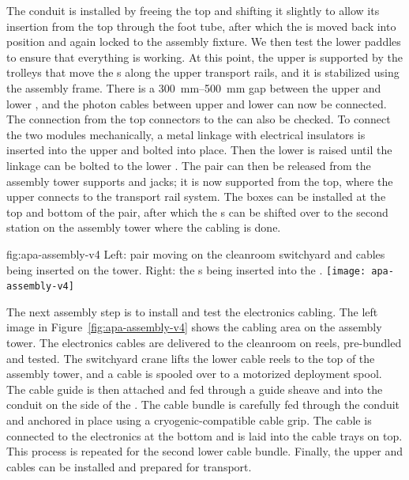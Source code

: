 The conduit is installed by freeing the top  and shifting it slightly to allow its insertion from the top through the foot tube, after which  
the  is moved back into position and again locked to the  assembly fixture.
We then test the lower   paddles %
to ensure that everything is working. 
At this point, the upper  is supported by the trolleys  that move the s along the upper transport rails, and it is stabilized using the  assembly frame. There is a \SIrange{300}{500}{mm} gap between the upper and lower , and the photon cables between upper and lower  can now be connected. The connection from the top connectors to the  can also be checked. 
To connect the two  modules mechanically, a metal linkage with electrical insulators is inserted into the upper  and bolted into place. Then the lower  is raised until the linkage can be bolted to the lower .  
The  pair can then be released from the assembly tower supports and jacks; it is now supported from the top, where the upper  connects to the transport rail system. The  boxes can be installed at the top and bottom of the  pair, after which %
the s can %
be shifted over to the second station on the assembly tower where the cabling is done.

\begin{dunefigure}{fig:apa-assembly-v4}
  { Left:  pair %
  moving on the cleanroom switchyard and cables being inserted on the tower. Right: the s being inserted into the \coldbox.}
\texttt{[image: apa-assembly-v4]}

\end{dunefigure}

The next assembly step is to install and test the electronics cabling.  The left image in Figure~\ref{fig:apa-assembly-v4} shows the  cabling area on the  assembly tower. 
The electronics cables are delivered to the cleanroom on reels,  pre-bundled and tested. 
The switchyard crane lifts the lower  cable reels to the top of the assembly tower, and a cable is %
spooled over to a motorized deployment spool. 
The cable guide is then attached and fed through a guide sheave and into the conduit on the side of the . The cable bundle is carefully fed through the conduit and anchored in place using a cryogenic-compatible cable grip. The cable is connected to the electronics at the bottom and is laid into the cable trays on top. This process is repeated for the second lower  cable bundle. 
Finally, the upper  and  cables can be installed and prepared for transport.

